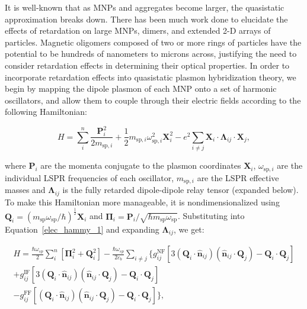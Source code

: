 \documentclass[journal=ancac3,manuscript=article]{achemso}
\begin{document}
It is well-known that as MNPs and aggregates become larger, the quasistatic approximation breaks down. There has been much work done to elucidate the effects of retardation on large MNPs\cite{Abajo2008,Gu2010}, dimers\cite{vonPlessen2007,Rechbacher2003,Kottman2001}, and extended 2-D arrays of particles\cite{Schatz2003,Royer2005,Chumanov2010}. Magnetic oligomers composed of two or more rings of particles have the potential to be hundreds of nanometers to microns across, justifying the need to consider retardation effects in determining their optical properties. In order to incorporate retardation effects into quasistatic plasmon hybridization theory, we begin by mapping the dipole plasmon of each MNP onto a set of harmonic oscillators, and allow them to couple through their electric fields according to the following Hamiltonian:

\begin{equation}
H = \sum_{i}^{n}\frac{\textbf{P}_{i}^{2}}{2m_{\textrm{sp},i}} + \frac{1}{2}m_{\textrm{sp},i}\omega_{\textrm{sp},i}^2\textbf{X}_{i}^{2} - e^2\sum_{i\neq j}\textbf{X}_i\cdot\boldsymbol{\Lambda}_{ij}\cdot\textbf{X}_j,\label{elec_hammy_1}
\end{equation}

where $\textbf{P}_i$ are the momenta conjugate to the plasmon coordinates $\textbf{X}_{i}$, $\omega_{\textrm{sp},i}$ are the individual LSPR frequencies of each oscillator, $m_{\textrm{sp},i}$ are the LSPR effective masses and $\boldsymbol{\Lambda}_{ij}$ is the fully retarded dipole-dipole relay tensor (expanded below)\cite{jackson_classical_1999}. To make this Hamiltonian more manageable, it is nondimensionalized using $\textbf{Q}_i = \left(m_{\textrm{sp}}\omega_{\textrm{sp}}/\hbar\right)^{\frac{1}{2}}\textbf{X}_i$ and $\boldsymbol{\Pi}_i = \textbf{P}_i/\sqrt{\hbar m_{\textrm{sp}}\omega_{\textrm{sp}}}$. Substituting into Equation~\ref{elec_hammy_1} and expanding $\boldsymbol{\Lambda}_{ij}$, we get:

\begin{equation}
\begin{aligned}
H = 
\frac{\hbar\omega_{sp}}{2}\sum_{i}^{n}[\boldsymbol{\Pi}_i^2 + \textbf{Q}_i^2] - \frac{\hbar\omega_{sp}}{2\varepsilon_b}\sum_{i\neq j}\{g_{ij}^{\textrm{NF}}\left[3(\textbf{Q}_i\cdot\hat{\textbf{n}}_{ij})(\hat{\textbf{n}}_{ij}\cdot\textbf{Q}_j) - \textbf{Q}_i\cdot\textbf{Q}_j\right] \\
+ g_{ij}^{\textrm{IF}}\left[3(\textbf{Q}_i\cdot\hat{\textbf{n}}_{ij})(\hat{\textbf{n}}_{ij}\cdot\textbf{Q}_j) -\textbf{Q}_i\cdot\textbf{Q}_j\right] \\ 
- g_{ij}^{\textrm{FF}}\left[(\textbf{Q}_i\cdot\hat{\textbf{n}}_{ij})(\hat{\textbf{n}}_{ij}\cdot\textbf{Q}_j) -\textbf{Q}_i\cdot\textbf{Q}_j\right]\},\label{elec_hammy_2}
\end{aligned}
\end{equation}
\end{document}
